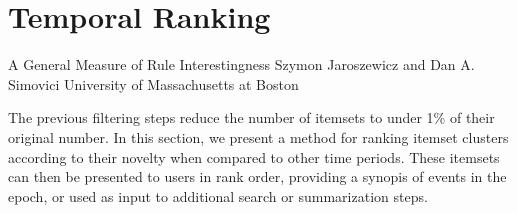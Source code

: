 \documentclass[letterpaper,12pt,titlepage,oneside,final]{book}
\begin{document}






\section{Temporal Ranking}
\label{sec:rank}

A General Measure of Rule Interestingness
Szymon Jaroszewicz and Dan A. Simovici
University of Massachusetts at Boston

The previous filtering steps reduce the number of itemsets to under 1\% of their
original number.
In this section, we present a method for ranking itemset clusters according to
their novelty when compared to other time periods.
These itemsets can then be presented to users in rank order, providing a
synopis of events in the epoch, or used as input to additional search or
summarization steps.
\end{document}

